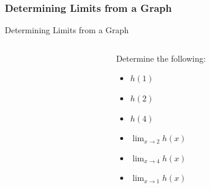 \documentclass[cal1spr16Lectures.tex]{subfiles}
\begin{document}
\subsubsection{Determining Limits from a Graph}
\begin{frame}{\small Determining Limits from a Graph}
\begin{exe}
\begin{columns}
\begin{column}{0.45\textwidth}
\end{column}
\begin{column}{0.50\textwidth}\footnotesize
	Determine the following:

	\vspace{-0.4pc}
	\begin{itemize}\footnotesize
	\item[(a)] $h(1)$
	
	\vspace{-0.25pc}
	\item[(b)] $h(2)$
	
	\vspace{-0.25pc}
	\item[(c)] $h(4)$
	
	\vspace{-0.25pc}
	\item[(d)] $\lim_{x \to 2} h(x)$
	
	
	\vspace{-0.25pc}
	\item[(e)] $\lim_{x \to 4} h(x)$
	
	\vspace{-0.25pc}
	\item[(f)] $\lim_{x \to 1} h(x)$
	\end{itemize}
\end{column}
\end{columns}
\end{exe}
\end{frame}
\end{document}
